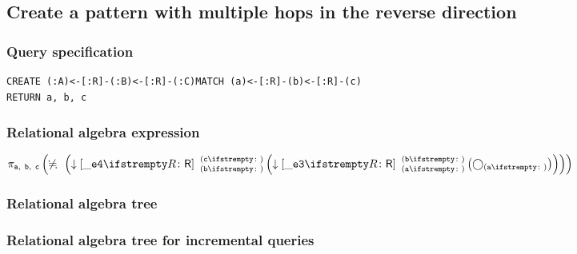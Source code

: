 \subsection{Create a pattern with multiple hops in the reverse direction}

\subsubsection*{Query specification}

\begin{lstlisting}
CREATE (:A)<-[:R]-(:B)<-[:R]-(:C)MATCH (a)<-[:R]-(b)<-[:R]-(c)
RETURN a, b, c
\end{lstlisting}

\subsubsection*{Relational algebra expression}

$\projection{\var{a},~\var{b},~\var{c}} \left(\alldifferent{} \left(\expandin{\_e4}{R}{b}{c}{} \left(\expandin{\_e3}{R}{a}{b}{} \left(\getvertices{a}{}\right)\right)\right)\right)$

\subsubsection*{Relational algebra tree}


\subsubsection*{Relational algebra tree for incremental queries}


